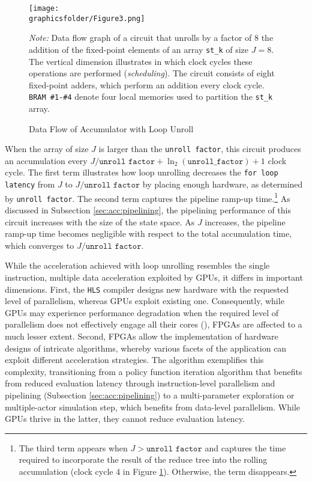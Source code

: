 \documentclass[12pt,american]{article}
\newcommand{\Naccsize}{J}
\newcommand{\graphicsfolder}{./graphics}
\begin{document}
\begin{figure}[ht!]
\caption{Data Flow of Accumulator with Loop Unroll}
\begin{center}
\texttt{[image: \\graphicsfolder/Figure3.png]}
\end{center}
\label{fig:acc:fix:unroll8:bram}
\small \textit{Note:} Data flow graph of a circuit that unrolls by a factor of 8 the addition of the fixed-point elements of an array \texttt{st\_k} of size $\Naccsize=8$. The vertical dimension illustrates in which clock cycles these operations are performed (\textit{scheduling}). The circuit consists of eight fixed-point adders, which perform an addition every clock cycle. \texttt{BRAM \#1-\#4} denote four local memories used to partition the \texttt{st\_k} array. 
\end{figure}

When the array of size $\Naccsize$ is larger than the \texttt{unroll factor}, this circuit produces an accumulation every $\Naccsize/\texttt{unroll}$ $\texttt{factor} + \ln_2(\texttt{unroll\_fac}\texttt{tor}) + 1$ clock cycle. The first term illustrates how loop unrolling decreases the \texttt{for loop latency} from  $\Naccsize$ to $\Naccsize/\texttt{unroll factor}$ by placing enough hardware, as determined by \texttt{unroll factor}. The second term captures the pipeline ramp-up time.\footnote{The third term appears when $\Naccsize>\texttt{unroll factor}$ and captures the time required to incorporate the result of the reduce tree into the rolling accumulation (clock cycle 4 in Figure \ref{fig:acc:fix:unroll8:bram}). Otherwise, the term disappears.} As discussed in Subsection \ref{sec:acc:pipelining}, the pipelining performance of this circuit increases with the size of the state space. As $\Naccsize$ increases, the pipeline ramp-up time becomes negligible with respect to the total accumulation time, which converges to $\Naccsize/\texttt{unroll factor}$. 

While the acceleration achieved with loop unrolling resembles the single instruction, multiple data acceleration exploited by GPUs, it differs in important dimensions. First, the \texttt{HLS} compiler designs new hardware with the requested level of parallelism, whereas GPUs exploit existing one. Consequently, while GPUs may experience performance degradation when the required level of parallelism does not effectively engage all their cores (\citealp{Aldrich2011}), FPGAs are affected to a much lesser extent. Second, FPGAs allow the implementation of hardware designs of intricate algorithms, whereby various facets of the application can exploit different acceleration strategies. The \citet{KrusellSmith1998} algorithm exemplifies this complexity, transitioning from a policy function iteration algorithm that benefits from reduced evaluation latency through instruction-level parallelism and pipelining (Subsection \ref{sec:acc:pipelining}) to a multi-parameter exploration or multiple-actor simulation step, which benefits from data-level parallelism. While GPUs thrive in the latter, they cannot reduce evaluation latency.
\end{document}

